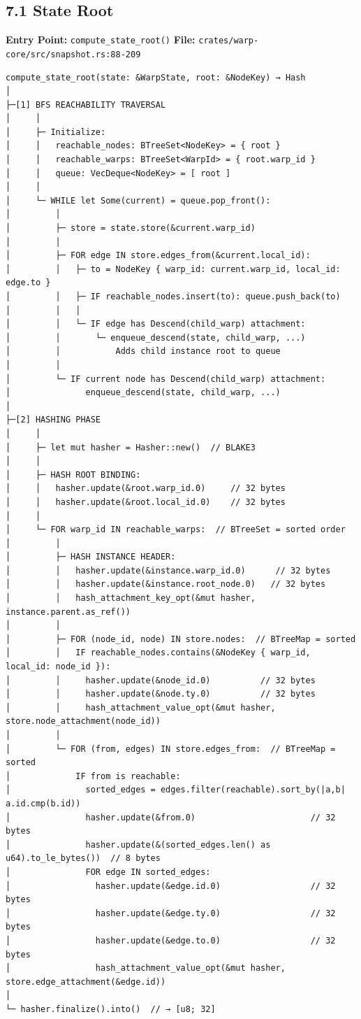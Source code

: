 \documentclass[
]{book}
\begin{document}
\subsection{7.1 State Root}\label{state-root}

\textbf{Entry Point:} \texttt{compute\_state\_root()} \textbf{File:}
\texttt{crates/warp-core/src/snapshot.rs:88-209}

\begin{verbatim}
compute_state_root(state: &WarpState, root: &NodeKey) → Hash
│
├─[1] BFS REACHABILITY TRAVERSAL
│     │
│     ├─ Initialize:
│     │   reachable_nodes: BTreeSet<NodeKey> = { root }
│     │   reachable_warps: BTreeSet<WarpId> = { root.warp_id }
│     │   queue: VecDeque<NodeKey> = [ root ]
│     │
│     └─ WHILE let Some(current) = queue.pop_front():
│         │
│         ├─ store = state.store(&current.warp_id)
│         │
│         ├─ FOR edge IN store.edges_from(&current.local_id):
│         │   ├─ to = NodeKey { warp_id: current.warp_id, local_id: edge.to }
│         │   ├─ IF reachable_nodes.insert(to): queue.push_back(to)
│         │   │
│         │   └─ IF edge has Descend(child_warp) attachment:
│         │       └─ enqueue_descend(state, child_warp, ...)
│         │           Adds child instance root to queue
│         │
│         └─ IF current node has Descend(child_warp) attachment:
│               enqueue_descend(state, child_warp, ...)
│
├─[2] HASHING PHASE
│     │
│     ├─ let mut hasher = Hasher::new()  // BLAKE3
│     │
│     ├─ HASH ROOT BINDING:
│     │   hasher.update(&root.warp_id.0)     // 32 bytes
│     │   hasher.update(&root.local_id.0)    // 32 bytes
│     │
│     └─ FOR warp_id IN reachable_warps:  // BTreeSet = sorted order
│         │
│         ├─ HASH INSTANCE HEADER:
│         │   hasher.update(&instance.warp_id.0)      // 32 bytes
│         │   hasher.update(&instance.root_node.0)   // 32 bytes
│         │   hash_attachment_key_opt(&mut hasher, instance.parent.as_ref())
│         │
│         ├─ FOR (node_id, node) IN store.nodes:  // BTreeMap = sorted
│         │   IF reachable_nodes.contains(&NodeKey { warp_id, local_id: node_id }):
│         │     hasher.update(&node_id.0)          // 32 bytes
│         │     hasher.update(&node.ty.0)          // 32 bytes
│         │     hash_attachment_value_opt(&mut hasher, store.node_attachment(node_id))
│         │
│         └─ FOR (from, edges) IN store.edges_from:  // BTreeMap = sorted
│             IF from is reachable:
│               sorted_edges = edges.filter(reachable).sort_by(|a,b| a.id.cmp(b.id))
│               hasher.update(&from.0)                       // 32 bytes
│               hasher.update(&(sorted_edges.len() as u64).to_le_bytes())  // 8 bytes
│               FOR edge IN sorted_edges:
│                 hasher.update(&edge.id.0)                  // 32 bytes
│                 hasher.update(&edge.ty.0)                  // 32 bytes
│                 hasher.update(&edge.to.0)                  // 32 bytes
│                 hash_attachment_value_opt(&mut hasher, store.edge_attachment(&edge.id))
│
└─ hasher.finalize().into()  // → [u8; 32]
\end{verbatim}
\end{document}
